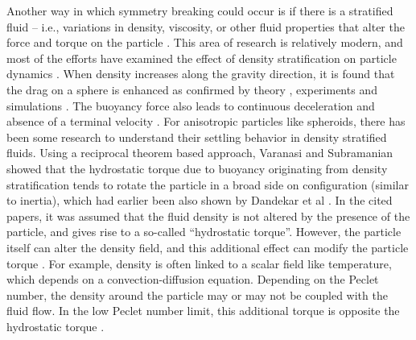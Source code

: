 \documentclass{jfm}
\begin{document}
Another way in which symmetry breaking could occur is if there is a stratified fluid – i.e., variations in density, viscosity, or other fluid properties that alter the force and torque on the particle \citep{ More_Ardekani_Review}.  This area of research is relatively modern, and most of the efforts have examined the effect of density stratification on particle dynamics \citep{DDA_JFM_2014,ADD_PRF_2017}. When density increases along the gravity direction, it is found that the drag on a sphere is enhanced as confirmed by theory \citep{MCM_Density_JFM_2018}, experiments \citep{Yick_JFM_2009,LP_Density_JFM_1984} and simulations \citep{HKO-POF-2009,MABA_DensityJFM_2021}. The buoyancy force also leads to continuous deceleration and absence of a terminal velocity \citep{DDA_JFM_2014}. For anisotropic particles like spheroids, there has been some research to understand their settling behavior in density stratified fluids. Using a reciprocal theorem based approach, Varanasi and Subramanian \citep{Varanasi_Subramanian_2022} showed that the hydrostatic torque due to buoyancy originating from density stratification tends to rotate the particle in a broad side on configuration (similar to inertia),  which had earlier been also shown by Dandekar et al \citep{Dandekar_Shaik_Ardekani_JFM2020}. In the cited papers, it was assumed that the fluid density is not altered by the presence of the particle, and gives rise to a so-called “hydrostatic torque”.  However, the particle itself can alter the density field, and this additional effect can modify the particle torque \citep{Varanasi_Subramanian_2022, MABA_DensityJFM_2021}.  For example, density is often linked to a scalar field like temperature, which depends on a convection-diffusion equation.  Depending on the Peclet number, the density around the particle may or may not be coupled with the fluid flow.  In the low Peclet number limit, this additional torque is opposite the hydrostatic torque \citep{Varanasi_Subramanian_2022, MABA_DensityJFM_2021}.
\end{document}
